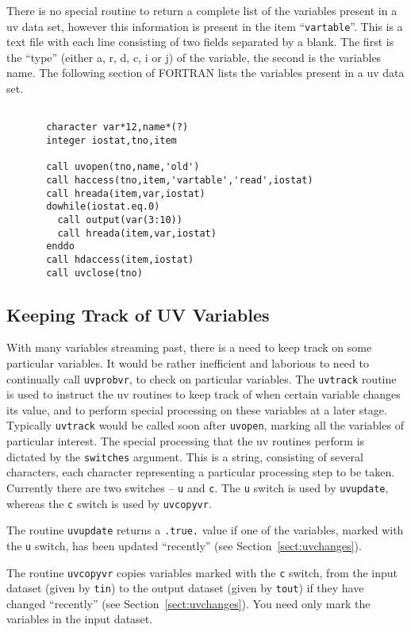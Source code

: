 There is no special routine to return a complete list of the variables
present in a uv data set, however this information is present in the 
item ``{\tt vartable}''. This is a text file with each line
consisting of two fields separated by a blank. The first is the ``type''
(either a, r, d, c, i or j) of the variable, the second is the variables name.
The following section of FORTRAN lists the variables present in a
uv data set.
\begin{verbatim}

       character var*12,name*(?)
       integer iostat,tno,item

       call uvopen(tno,name,'old')
       call haccess(tno,item,'vartable','read',iostat)
       call hreada(item,var,iostat)
       dowhile(iostat.eq.0)
         call output(var(3:10))
         call hreada(item,var,iostat)
       enddo
       call hdaccess(item,iostat)
       call uvclose(tno)

\end{verbatim}

\subsection{Keeping Track of UV Variables}
With many variables streaming past, there is a need to keep track on some
particular variables. It would be rather inefficient and laborious to need
to continually call {\tt uvprobvr}, to check on particular variables. The
{\tt uvtrack} routine is used to instruct the uv routines to keep track
of when certain variable changes its value, and to perform special
processing on these variables at a later stage. Typically {\tt uvtrack}
would be called soon after {\tt uvopen}, marking all the variables of
particular interest. The special processing that the uv routines perform
is dictated by the {\tt switches} argument. This is a string,
consisting of several characters, each character representing a particular
processing step to be taken. Currently there are two switches --
{\tt u} and {\tt c}. The {\tt u} switch is used by {\tt uvupdate}, whereas
the {\tt c} switch is used by {\tt uvcopyvr}.

The routine
{\tt uvupdate} returns a {\tt .true.} value if one of the variables, marked
with the {\tt u} switch, has been updated ``recently''
(see Section~\ref{sect:uvchanges}).

The routine {\tt uvcopyvr} copies variables marked with the {\tt c}
switch, from the input dataset (given by {\tt tin}) to the output
dataset (given by {\tt tout}) if they have changed ``recently'' (see
Section~\ref{sect:uvchanges}). You need only
mark the variables in the input dataset.

